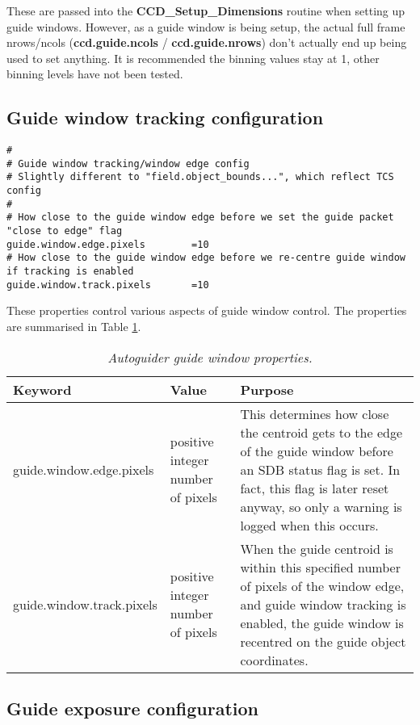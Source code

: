 \documentclass[10pt,a4paper]{article}
\begin{document}
These are passed into the {\bf CCD\_Setup\_Dimensions} routine when setting up guide windows. However, as a guide window is being setup, the actual full frame nrows/ncols ({\bf ccd.guide.ncols} / {\bf ccd.guide.nrows}) don't actually end up being used to set anything. It is recommended the binning values stay at 1, other binning levels have not been tested.

\subsection{Guide window tracking configuration}

\begin{verbatim}
#
# Guide window tracking/window edge config
# Slightly different to "field.object_bounds...", which reflect TCS config
#
# How close to the guide window edge before we set the guide packet "close to edge" flag
guide.window.edge.pixels		=10
# How close to the guide window edge before we re-centre guide window if tracking is enabled
guide.window.track.pixels		=10
\end{verbatim}

These properties control various aspects of guide window control. The properties are summarised in Table \ref{tab:autoguiderguidewindowproperties}.

\begin{table}[!h]
\begin{center}
\begin{tabular}{|l|l|p{20em}|}
\hline
{\bf Keyword}              & {\bf Value} & {\bf Purpose} \\ \hline
guide.window.edge.pixels   & positive integer number of pixels & This determines how close the centroid gets to the edge of the guide window before an SDB status flag is set. In fact, this flag is later reset anyway, so only a warning is logged when this occurs. \\ \hline
guide.window.track.pixels  & positive integer number of pixels & When the guide centroid is within this specified number of pixels of the window edge, and guide window tracking is enabled, the guide window is recentred on the guide object coordinates. \\ \hline
\end{tabular}
\end{center}
\caption{\em Autoguider guide window properties.}
\label{tab:autoguiderguidewindowproperties}
\end{table}

\subsection{Guide exposure configuration}
\end{document}
